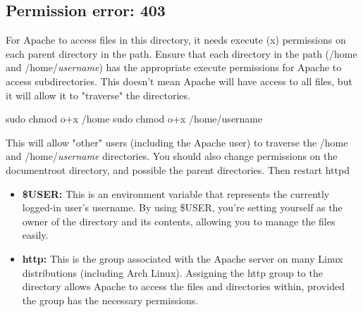\documentclass{report}
\begin{document}
    \bigbreak \noindent 
    \subsection{Permission error: 403}
    \bigbreak \noindent 
    For Apache to access files in this directory, it needs execute (x) permissions on each parent directory in the path.
    \bigbreak \noindent 
    Ensure that each directory in the path (/home and /home/\textit{username}) has the appropriate execute permissions for Apache to access subdirectories. This doesn't mean Apache will have access to all files, but it will allow it to "traverse" the directories.
    \bigbreak \noindent 
    \begin{bashcode}
        sudo chmod o+x /home
        sudo chmod o+x /home/username
    \end{bashcode}
    \bigbreak \noindent 
    This will allow "other" users (including the Apache user) to traverse the /home and /home/\textit{username} directories.
    \bigbreak \noindent 
    You should also change permissions on the documentroot directory, and possible the parent directories. Then restart httpd
    \bigbreak \noindent 
    \begin{itemize}
        \item \textbf{\$USER:} This is an environment variable that represents the currently logged-in user's username. By using \$USER, you’re setting yourself as the owner of the directory and its contents, allowing you to manage the files easily.
        \item \textbf{http:} This is the group associated with the Apache server on many Linux distributions (including Arch Linux). Assigning the http group to the directory allows Apache to access the files and directories within, provided the group has the necessary permissions.
    \end{itemize}
\end{document}
